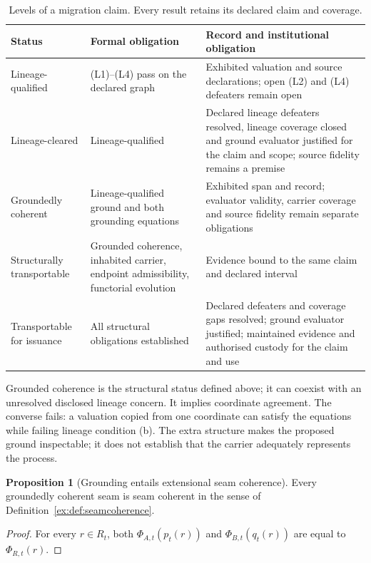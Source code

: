 \documentclass[11pt]{article}
\theoremstyle{definition}
\newtheorem{proposition}{Proposition}[section]
\begin{document}
\begin{table}[htbp]
\centering\small
\caption{Levels of a migration claim. Every result retains its declared claim and coverage.}
\label{ex:tab:claim-levels}
\begin{tabularx}{\textwidth}{@{}P{3.1cm}LL@{}}
\toprule
Status & Formal obligation & Record and institutional obligation \\
\midrule
Lineage-qualified & (L1)--(L4) pass on the declared graph & Exhibited valuation and source declarations; open (L2) and (L4) defeaters remain open \\
Lineage-cleared & Lineage-qualified & Declared lineage defeaters resolved, lineage coverage closed and ground evaluator justified for the claim and scope; source fidelity remains a premise \\
Groundedly coherent & Lineage-qualified ground and both grounding equations & Exhibited span and record; evaluator validity, carrier coverage and source fidelity remain separate obligations \\
Structurally transportable & Grounded coherence, inhabited carrier, endpoint admissibility, functorial evolution & Evidence bound to the same claim and declared interval \\
Transportable for issuance & All structural obligations established & Declared defeaters and coverage gaps resolved; ground evaluator justified; maintained evidence and authorised custody for the claim and use \\
\bottomrule
\end{tabularx}
\end{table}

Grounded coherence is the structural status defined above; it can coexist with an unresolved disclosed lineage concern. It implies coordinate agreement. The converse fails: a valuation copied from one coordinate can satisfy the equations while failing lineage condition (b). The extra structure makes the proposed ground inspectable; it does not establish that the carrier adequately represents the process.

\begin{proposition}[Grounding entails extensional seam coherence]\label{ex:prop:grounding-entails-coherence}
Every groundedly coherent seam is seam coherent in the sense of Definition~\ref{ex:def:seamcoherence}.
\end{proposition}

\begin{proof}
For every $r\in R_t$, both
$\Phi_{A,t}(p_t(r))$ and
$\Phi_{B,t}(q_t(r))$ are equal to
$\Phi_{R,t}(r)$.
\end{proof}
\end{document}
